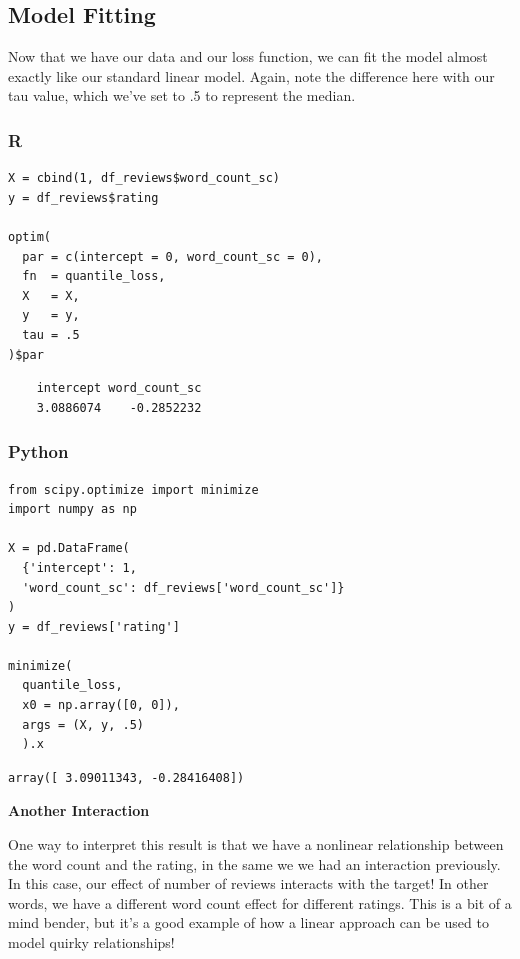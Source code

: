 \documentclass[
  letterpaper,
]{krantz}
\begin{document}
\subsection{Model Fitting}\label{sec-quantile-model}

Now that we have our data and our loss function, we can fit the model
almost exactly like our standard linear model. Again, note the
difference here with our tau value, which we've set to .5 to represent
the median.

\subsubsection{R}

\begin{verbatim}
X = cbind(1, df_reviews$word_count_sc)
y = df_reviews$rating

optim(
  par = c(intercept = 0, word_count_sc = 0),
  fn  = quantile_loss,
  X   = X,
  y   = y,
  tau = .5
)$par
\end{verbatim}

\begin{verbatim}
    intercept word_count_sc 
    3.0886074    -0.2852232 
\end{verbatim}

\subsubsection{Python}

\begin{verbatim}
from scipy.optimize import minimize
import numpy as np

X = pd.DataFrame(
  {'intercept': 1, 
  'word_count_sc': df_reviews['word_count_sc']}
)
y = df_reviews['rating']

minimize(
  quantile_loss, 
  x0 = np.array([0, 0]), 
  args = (X, y, .5)
  ).x
\end{verbatim}

\begin{verbatim}
array([ 3.09011343, -0.28416408])
\end{verbatim}

\begin{tcolorbox}[enhanced jigsaw, bottomrule=.15mm, rightrule=.15mm, colframe=quarto-callout-tip-color-frame, colback=white, breakable, arc=.35mm, left=2mm, opacityback=0, leftrule=.75mm, toprule=.15mm]

\vspace{-3mm}\textbf{Another Interaction}\vspace{3mm}

One way to interpret this result is that we have a nonlinear
relationship between the word count and the rating, in the same we we
had an interaction previously. In this case, our effect of number of
reviews interacts with the target! In other words, we have a different
word count effect for different ratings. This is a bit of a mind bender,
but it's a good example of how a linear approach can be used to model
quirky relationships!

\end{tcolorbox}
\end{document}
